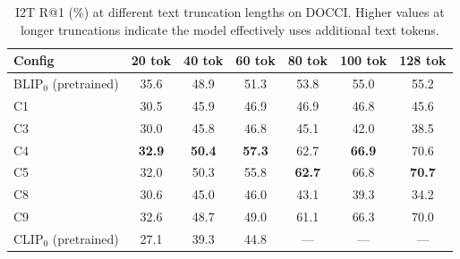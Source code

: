 \begin{table}[t]
\centering
\caption{I2T R@1 (\%) at different text truncation lengths on DOCCI. Higher values at longer truncations indicate the model effectively uses additional text tokens.}
\label{tab:truncation_docci}
\small
\setlength{\tabcolsep}{5pt}
\begin{tabular}{lcccccc}
\toprule
\textbf{Config} & 20 tok & 40 tok & 60 tok & 80 tok & 100 tok & 128 tok \\
\midrule
BLIP$_0$ (pretrained) & 35.6 & 48.9 & 51.3 & 53.8 & 55.0 & 55.2 \\
\midrule
C1 & 30.5 & 45.9 & 46.9 & 46.9 & 46.8 & 45.6 \\
C3 & 30.0 & 45.8 & 46.8 & 45.1 & 42.0 & 38.5 \\
C4 & \textbf{32.9} & \textbf{50.4} & \textbf{57.3} & 62.7 & \textbf{66.9} & 70.6 \\
C5 & 32.0 & 50.3 & 55.8 & \textbf{62.7} & 66.8 & \textbf{70.7} \\
C8 & 30.6 & 45.0 & 46.0 & 43.1 & 39.3 & 34.2 \\
C9 & 32.6 & 48.7 & 49.0 & 61.1 & 66.3 & 70.0 \\
CLIP$_0$ (pretrained) & 27.1 & 39.3 & 44.8 & --- & --- & --- \\
\bottomrule
\end{tabular}
\end{table}

